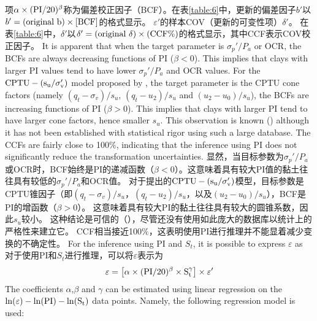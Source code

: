     \ParallelRText
    {
        项$\alpha\times{}(\rm{PI}/20)^\beta$称为偏差校正因子（BCF）。在表\ref{table:6}中，更新的偏差因子$b'$以$b'=(\rm{original}~b)\times{}[BCF]$的格式显示。 $\varepsilon'$的样本COV（更新的可变性项）$\delta'$。 在表\ref{table:6}中，$\delta'$以$\delta'=(\rm{original}~\delta)\times{}(\rm{CCF}\%)$的格式显示，其中CCF表示COV校正因子。
    }
    \ParallelPar
    \ParallelLText
    {
        It is apparent that when the target parameter is $\sigma_p'/P_a$ or OCR, the BCFs are always decreasing functions of PI ($\beta<0$). This implies that clays with larger PI values tend to have lower $\sigma_p'/P_a$ and OCR values. For the $\rm{CPTU}-(s_u/\sigma_v')$ model proposed by \citet{Ching201252}, the target parameter is the CPTU cone factors (namely $(q_t-\sigma_v)/s_u$, $(q_t-u_2)/s_u$ and $(u_2-u_0)/s_u$), the BCFs are increasing functions of PI ($\beta>0$). This implies that clays with larger PI tend to have larger cone factors, hence smaller $s_u$. This observation is known (\citealt{Aas19861,Marsland1988209,Powell1988903}) although it has not been established with statistical rigor using such a large database. The CCFs are fairly close to 100$\%$, indicating that the inference using PI does not significantly reduce the transformation uncertainties.
    }
    \ParallelRText
    {
        显然，当目标参数为$\sigma_p'/P_a$或OCR时，BCF始终是PI的递减函数（$\beta<0$）。这意味着具有较大PI值的黏土往往具有较低的$\sigma_p'/P_a$和OCR值。 对于\citet{Ching201252}提出的$\rm{CPTU}-(s_u/\sigma_v')$模型，目标参数是CPTU锥因子（即$(q_t-\sigma_v)/s_u$，$(q_t-u_2)/s_u$，以及$(u_2-u_0)/s_u$），BCF是PI的增函数（$\beta>0$）。 这意味着具有较大PI的黏土往往具有较大的圆锥系数，因此$s_u$较小。 这种结论是可信的（\citealt{Aas19861,Marsland1988209,Powell1988903}），尽管还没有使用如此庞大的数据库以统计上的严格性来建立它。 CCF相当接近100$\%$，这表明使用PI进行推理并不能显着减少变换的不确定性。
    }
    \ParallelPar
    \ParallelLText
    {
        For the inference using PI and $S_t$, it is possible to express $\varepsilon$ as
    }
    \ParallelRText
    {
        对于使用PI和$S_t$进行推理，可以将$\varepsilon$表示为
    }
    \ParallelPar
    \begin{align}
        \varepsilon=\left[\alpha\times{}(\rm{PI}/20)^\beta\times{}S_t^\gamma\right]\times{}\varepsilon'
        \label{equation:8}
    \end{align}
    \ParallelLText
    {
        The coefficients  $\alpha$,$\beta$ and $\gamma$ can be estimated using linear regression on the $\ln(\varepsilon)-\ln(\rm{PI})-\ln(S_t)$ data points. Namely, the following regression model is used:
    }
